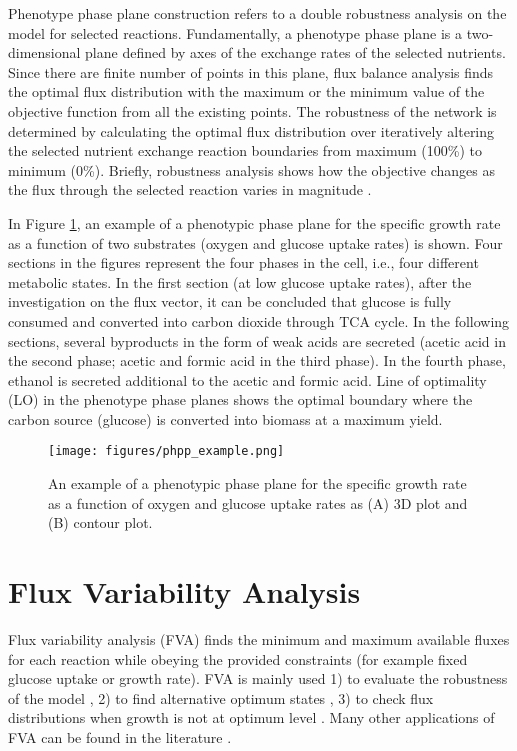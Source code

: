 Phenotype phase plane construction refers to a double robustness analysis on the model for selected reactions. Fundamentally, a phenotype phase plane is a two-dimensional plane defined by axes of the exchange rates of the selected nutrients. Since there are finite number of points in this plane, flux balance analysis finds the optimal flux distribution with the maximum or the minimum value of the objective function from all the existing points. The robustness of the network is determined by calculating the optimal flux distribution over iteratively altering the selected nutrient exchange reaction boundaries from maximum (100\%) to minimum (0\%). Briefly, robustness analysis shows how the objective changes as the flux through the selected reaction varies in magnitude \cite{edwards2002characterizing}.


In Figure \ref{fig:phpp_example}, an example of a phenotypic phase plane for the specific growth rate as a function of two substrates (oxygen and glucose uptake rates) is shown. Four sections in the figures represent the four phases in the cell, i.e., four different metabolic states. In the first section (at low glucose uptake rates), after the investigation on the flux vector, it can be concluded that glucose is fully consumed and converted into carbon dioxide through TCA cycle. In the following sections, several byproducts in the form of weak acids are secreted (acetic acid in the second phase; acetic and formic acid in the third phase). In the fourth phase, ethanol is secreted additional to the acetic and formic acid. Line of optimality (LO) in the phenotype phase planes shows the optimal boundary where the carbon source (glucose) is converted into biomass at a maximum yield.

\begin{figure}[H]
\begin{center}
\texttt{[image: figures/phpp\_example.png]}
\caption[An example of a phenotypic phase plane for the specific growth rate as a function of oxygen and glucose uptake rates as (A) 3D plot and (B) contour plot]{An example of a phenotypic phase plane for the specific growth rate as a function of oxygen and glucose uptake rates as (A) 3D plot and (B) contour plot.}
\label{fig:phpp_example}
\end{center}
\end{figure}


\section{Flux Variability Analysis}
Flux variability analysis (FVA) finds the minimum and maximum available fluxes for each reaction while obeying the provided constraints (for example fixed glucose uptake or growth rate). FVA is mainly used  1) to evaluate the robustness of the model \cite{thiele2010functional}, 2) to find alternative optimum states \cite{mahadevan2003effects}, 3) to check flux distributions when growth is not at optimum level \cite{reed2004genome}. Many other applications of FVA can be found in the literature \cite{gudmundsson2010computationally}.

